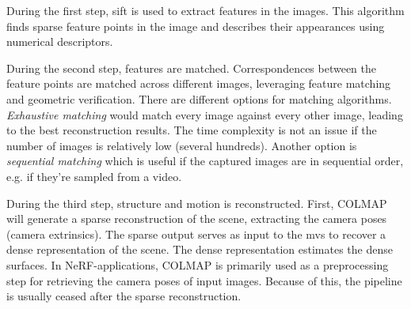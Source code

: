 During the first step, \acrfull{sift} \cite{lowe_distinctive_2004} is used to extract features in the images. This algorithm finds sparse feature points in the image and describes their appearances using numerical descriptors.


During the second step, features are matched. Correspondences between the feature points are matched across different images, leveraging feature matching and geometric verification. There are different options for matching algorithms. \textit{Exhaustive matching} would match every image against every other image, leading to the best reconstruction results. The time complexity is not an issue if the number of images is relatively low (several hundreds). Another option is \textit{sequential matching} which is useful if the captured images are in sequential order, e.g. if they're sampled from a video.

During the third step, structure and motion is reconstructed. First, COLMAP will generate a sparse reconstruction of the scene, extracting the camera poses (camera extrinsics). The sparse output serves as input to the \acrfull{mvs} to recover a dense representation of the scene. The dense representation estimates the dense surfaces. In NeRF-applications, COLMAP is primarily used as a preprocessing step for retrieving the camera poses of input images. Because of this, the pipeline is usually ceased after the sparse reconstruction.



\begin{comment}
Exhaustive matching:
time complexity: O(n^2), where n is the number of images
memory complexity: O(n) for storing all images, O(n^2) for storing the results of the matching process

Sequential matching:
time complexity: O(n * k), where n is the number of images and k is the number of adjacent images each image is matched against
memory complexity: O(n * k)

Vocabulary tree-based matching:
time complexity: O(n^2), assuming that the size of the vocabulary tree is constant and not a function of the number n of images
memory complexity: O(n * k), where k is the number of top-retrieved images that each image is matched against
There is definitively literature on the topic of the time and memory complexity of vocabulary tree-based matching and image retrieval
\end{comment}

